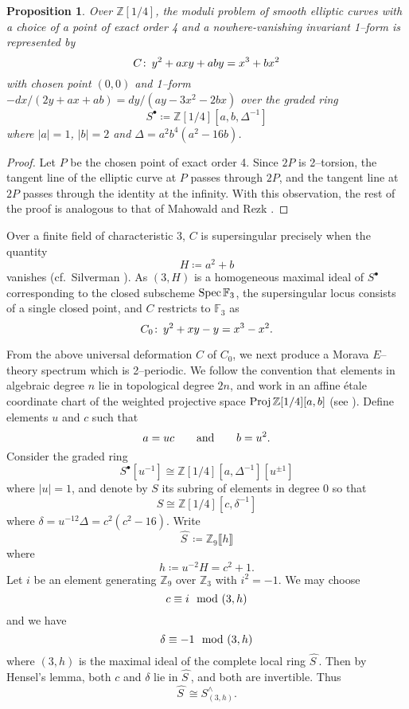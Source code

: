 \documentclass[microtype]{gtpart}     %
\newtheorem{prop}{Proposition}[section]
\theoremstyle{remark}
\theoremstyle{definition}
\def\co{\colon\thinspace}
\newcommand{\mb}[1]{\mathbb{#1}}
\newcommand{\Spec}{{\rm Spec\thinspace}}
\newcommand{\Proj}{{\rm Proj\thinspace}}
\newcommand{\BF}{{\mb F}}
\newcommand{\BZ}{{\mb Z}}
\newcommand{\HS}{\widehat{S~}\!}
\newcommand{\md}{~~{\rm mod}~}
\newcommand{\ad}{{\rm and}}
\newcommand{\ce}{\coloneqq}
\newcommand{\s}{S^\bullet}
\begin{document}
\begin{prop}
\label{prop:C}
 Over $\BZ [1/4]$, the moduli problem of smooth elliptic curves with a choice 
 of a point of exact order 4 and a nowhere-vanishing invariant 1--form is 
 represented by 
 \begin{equation}
 \label{Cxy}
  C \co y^2 + a x y + a b y = x^3 + b x^2 
 \end{equation}
 with chosen point $(0,0)$ and 1--form 
 $-dx / (2 y + a x + a b) = dy / (a y - 3 x^2 - 2 b x)$ over the graded ring 
 \[
  \s \ce \BZ [1/4] [a, b, \Delta^{-1}] 
 \]
 where $|a| = 1$, $|b| = 2$ and $\Delta = a^2 b^4 (a^2 - 16 b)$.  
\end{prop}
\begin{proof}
 Let $P$ be the chosen point of exact order 4.  Since $2P$ is 2--torsion, the 
 tangent line of the elliptic curve at $P$ passes through $2P$, and the 
 tangent line at $2P$ passes through the identity at the infinity.  With this 
 observation, the rest of the proof is analogous to that of Mahowald and Rezk 
 \cite[Proposition 3.2]{tmf3}.  
\end{proof}

Over a finite field of characteristic 3, $C$ is supersingular precisely when 
the quantity 
\begin{equation}
\label{H}
 H \ce a^2 + b 
\end{equation}
vanishes (cf.~Silverman \cite[V.4.1a]{AEC}).  As $(3,H)$ is a homogeneous 
maximal ideal of $\s$ corresponding to the closed subscheme $\Spec \BF_3$, 
the supersingular locus consists of a single closed point, and $C$ restricts 
to $\BF_3$ as 
\[
 C_0 \co y^2 + x y - y = x^3 - x^2.  
\]

From the above universal deformation $C$ of $C_0$, we next produce a Morava 
$E$--theory spectrum which is 2--periodic.  We follow the convention that 
elements in algebraic degree $n$ lie in topological degree $2n$, and work in 
an affine \'etale coordinate chart of the weighted projective space 
$\Proj \BZ [1/4] [a, b]$ (see ).  Define elements $u$ 
and $c$ such that 
\begin{equation}
\label{uc}
 a = u c \qquad \ad \qquad b = u^2.  
\end{equation}
Consider the graded ring 
\[
 \s [u^{-1}] \cong \BZ [1/4] [a, \Delta^{-1}] [u^{\pm1}] 
\]
where $|u| = 1$, and denote by $S$ its subring of elements in degree 0 so 
that 
\begin{equation}
\label{S}
 S \cong \BZ [1/4] [c, \delta^{-1}] 
\end{equation}
where $\delta = u^{-12} \Delta = c^2 (c^2 - 16)$.  Write 
\[
 \HS \ce \BZ_9 \llbracket h \rrbracket 
\]
where 
\begin{equation}
\label{h}
 h \ce u^{-2} H = c^2 + 1.  
\end{equation}
Let $i$ be an element generating $\BZ_9$ over $\BZ_3$ with $i^2 = -1$.  We 
may choose 
\[
 c \equiv i \md (3,h) 
\]
and we have 
\[
 \delta \equiv -1 \md (3,h) 
\]
where $(3,h)$ is the maximal ideal of the complete local ring $\HS$.  Then by 
Hensel's lemma, both $c$ and $\delta$ lie in $\HS$, and both are invertible.  
Thus 
\[
 \HS \cong S_{(3,h)}^\wedge.  
\]
\end{document}
